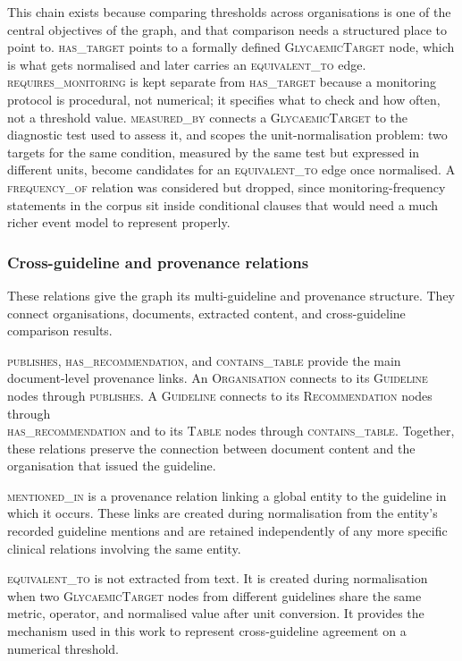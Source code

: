 This chain exists because comparing thresholds across organisations is one of the central objectives of the graph, and that comparison needs a structured place to point to. \textsc{has\_target} points to a formally defined \textsc{GlycaemicTarget} node, which is what gets normalised and later carries an \textsc{equivalent\_to} edge. \textsc{requires\_monitoring} is kept separate from \textsc{has\_target} because a monitoring protocol is procedural, not numerical; it specifies what to check and how often, not a threshold value. \textsc{measured\_by} connects a  \textsc{GlycaemicTarget} to the diagnostic test used to assess it, and scopes the unit-normalisation problem: two targets for the same condition, measured by the same test but expressed in different units, become candidates for an \textsc{equivalent\_to} edge once normalised. A \textsc{frequency\_of} relation was considered but dropped, since monitoring-frequency statements in the corpus sit inside conditional clauses that would need a much richer event model to represent properly.

\subsubsection{Cross-guideline and provenance relations}
These relations give the graph its multi-guideline and provenance structure. They connect organisations, documents, extracted content, and cross-guideline comparison results.

\textsc{publishes}, \textsc{has\_recommendation}, and
\textsc{contains\_table} provide the main document-level provenance
links. An \textsc{Organisation} connects to its \textsc{Guideline}
nodes through \textsc{publishes}. A \textsc{Guideline} connects to its
\textsc{Recommendation} nodes through \\ \textsc{has\_recommendation} and
to its \textsc{Table} nodes through \textsc{contains\_table}. Together,
these relations preserve the connection between document content and
the organisation that issued the guideline.

\textsc{mentioned\_in} is a provenance relation linking a global entity to the guideline in which it occurs. These links are created during normalisation from the entity's recorded guideline mentions and are retained independently of any more specific clinical relations involving the same entity.

\textsc{equivalent\_to} is not extracted from text. It is created during
normalisation when two \textsc{GlycaemicTarget} nodes from different
guidelines share the same metric, operator, and normalised value after
unit conversion. It provides the mechanism used in this work to represent
cross-guideline agreement on a numerical threshold.

